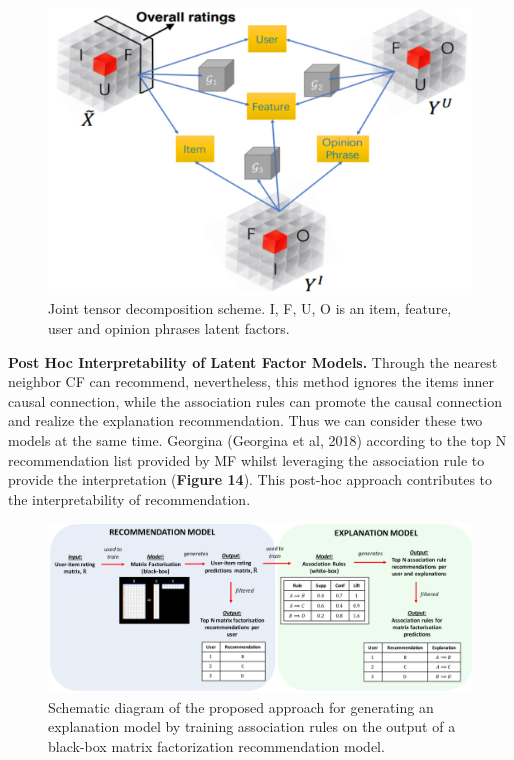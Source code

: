 \documentclass[10pt,twocolumn,letterpaper]{article}
\begin{document}
\begin{figure}
	\begin{center}
		\includegraphics[width=0.8\linewidth]{multi_task_2.png}
	\end{center}
	\caption{Joint tensor decomposition scheme. I, F, U, O is an item, feature, user and opinion phrases latent factors.}
	\label{fig:long}
	\label{fig:onecol}
\end{figure}    

{\bf Post Hoc Interpretability of Latent Factor Models.} Through the nearest neighbor CF can recommend, nevertheless, this method ignores the items inner causal connection, while the association rules can promote the causal connection and realize the explanation recommendation. Thus we can consider these two models at the same time. Georgina (Georgina et al, 2018) according to the top N recommendation list provided by MF whilst leveraging the association rule to provide the interpretation ({\bf Figure 14}). This post-hoc approach contributes to the interpretability of recommendation. 
\begin{figure}
	\begin{center}
		\includegraphics[width=.9\linewidth]{post_hog.png}
	\end{center}
	\caption{Schematic diagram of the proposed approach for generating an explanation model by training association rules on the output of a black-box matrix factorization recommendation model.}
	\label{fig:short}
\end{figure}
\end{document}
